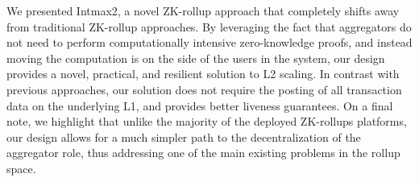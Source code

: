 We presented Intmax2, a novel ZK-rollup approach that completely shifts away from traditional ZK-rollup approaches. By leveraging the fact that aggregators do not need to perform computationally intensive zero-knowledge proofs, and instead moving the computation is on the side of the users in the system, our design provides a novel, practical, and resilient solution to L2 scaling. In contrast with previous approaches, our solution does not require the posting of all transaction data on the underlying L1, and provides better liveness guarantees. On a final note, we highlight that unlike the majority of the deployed ZK-rollups platforms, our design allows for a much simpler path to the decentralization of the aggregator role, thus addressing one of the main existing problems in the rollup space. 
